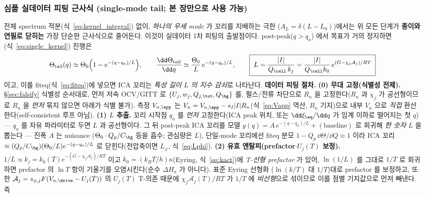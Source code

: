 \subsubsection{심플 실데이터 피팅 근사식 (single-mode tail; 본 장만으로 사용 가능)}\label{sec:ch1_simplefit}
전체 spectrum 적분(식~\eqref{eq:kernel_integral}) 없이, \emph{하나의 우세 mode} 가 꼬리를 지배하는 극한
($A_L=\delta(L-L_0)$)에서는 위 모든 단계가 \textbf{종이와 연필로 닫히는} 가장 단순한 근사식으로 줄어든다. 이것이
실데이터 1차 피팅의 출발점이다. post-peak($q>q_a$) 에서 목표가 거의 정지하면(식~\eqref{eq:single_kernel}) 진행은
\begin{equation}
\Theta_\mathrm{tail}(q)\simeq\Theta_0\Big(1-e^{-(q-q_a)/L}\Big),\qquad
\frac{\dd\Theta_\mathrm{tail}}{\dd q}\simeq\frac{\Theta_0}{L}\,e^{-(q-q_a)/L},\qquad
\boxed{\;L=\frac{|I|}{Q_\cell\,k_j}=\frac{|I|}{Q_\cell k_0}\,e^{(G-\chi_j\mathcal A_j)/RT}\;}
\label{eq:simplefit}
\end{equation}
이고, 이를 fiteq(식~\eqref{eq:fiteq})에 넣으면 ICA 꼬리는 \emph{특성 길이 $L$ 의 지수 감쇠}로 나타난다.
\textbf{데이터 피팅 절차.}
\textbf{(0) 무대 고정(식별성 전제).} \S\ref{sec:falsify} 식별성 순서대로, 먼저 저속 OCV/GITT 로
$\{U_j,w_j,Q_{j,\tot},Q_\bg\}$ 를, 펄스/전류 차단으로 $R_n$ 을 고정한다($R_n$ 과 $\chi_j$ 가 공선형이므로 $R_n$ 을
\emph{먼저} 묶지 않으면 아래가 식별 불가). 측정 $V_{n,\app}$ 는 $V_n=V_{n,\app}-s_I|I|R_n$(식~\eqref{eq:Vapp} 역산,
$R_n$ 기지)으로 내부 $V_n$ 으로 \emph{직접} 환산한다(self-consistent 루프 아님).
\textbf{(1) $L$ 추출.} 꼬리 시작점 $q_a$ 를 \emph{먼저} 고정한다(ICA peak 위치, 또는 $\dd\xi_{\eq}/\dd q$ 가 임계
이하로 떨어지는 첫 $q$) — $q_a$ 를 자유 파라미터로 두면 $L$ 과 공선형이다. 그 뒤 post-peak ICA 꼬리를
모델 $y(q)=A\,e^{-(q-q_a)/L}+(\text{baseline})$ 로 회귀해 \emph{한 숫자} $L$ 을 뽑는다 — 진폭 $A$ 는 nuisance
($\Theta_0\cdot Q_p/C_\bg$ 등을 흡수; 관심량은 $L$), 단일-mode 꼬리에선 fiteq 분모 $1-Q_p\,\dd\Theta/\dd Q\!\approx\!1$
이라 ICA 꼬리 $\approx(Q_p/C_\bg)(\Theta_0/L)e^{-(q-q_a)/L}$ 로 닫힌다(전압축이면 $L_\varphi$, 식~\eqref{eq:Lphi}).
\textbf{(2) 유효 엔탈피(prefactor$\cdot U_j(T)$ 보정).} $1/L\propto k_j=k_0(T)e^{-(G-\chi_j\mathcal A_j)/RT}$ 이고
$k_0=(k_BT/h)\kappa$(Eyring, 식~\eqref{eq:kact})에 \emph{T-선형 prefactor} 가 있어, $\ln(1/L)$ 를 그대로
$1/T$ 로 회귀하면 prefactor 의 $\ln T$ 항이 기울기를 오염시킨다(순수 $\Delta H_a$ 가 아니다). 표준 Eyring 선형화
($\ln(k/T)$ 대 $1/T$)대로 prefactor 를 보정하고, 또한 $\mathcal A_j=s_{\phi,j}F(V_{n,\drive}-U_j(T))$ 의 $U_j(T)$
T-의존 때문에 $\chi_j\mathcal A_j(T)/RT$ 가 $1/T$ 에 \emph{비선형}으로 섞이므로 이를 점별 기지값으로 먼저 빼낸다. 즉
